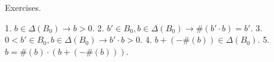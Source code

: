Exercises.

1. $b \in \Delta(B_0) \rightarrow b > 0$.
2. $b' \in B_0, b \in \Delta(B_0) \rightarrow \#(b' \cdot b) = b'$.
3. $0 < b' \in B_0, b \in \Delta(B_0) \rightarrow b' \cdot b > 0$.
4. $b + (-\#(b)) \in \Delta(B_0)$.
5. $b = \#(b) \cdot (b + (-\#(b)))$.
